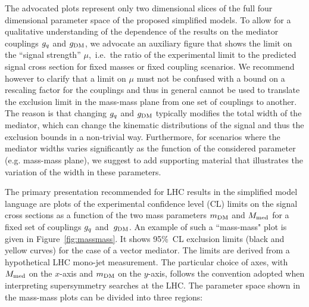 The advocated plots represent only two dimensional slices of the full four dimensional parameter space of the proposed simplified models. To allow for a qualitative understanding of the dependence of the results on the mediator couplings $g_q$ and $g_{\rm{DM}}$,  we advocate an auxiliary figure that shows the limit on the ``signal strength'' $\mu$,~i.e.~the ratio of the experimental limit to the predicted signal cross section for fixed masses or fixed coupling scenarios.  We recommend however to clarify that a limit on $\mu$ must not be confused with a bound on a rescaling factor for the couplings and thus in general cannot be used to translate the exclusion limit in the mass-mass plane from one set of couplings to another. The reason is that changing $g_q$ and $g_{\rm{DM}}$ typically modifies the total width of the mediator, which can change the kinematic distributions of the signal and thus the exclusion bounds in a non-trivial way. 
Furthermore, for scenarios where the mediator widths varies significantly as the function of the considered parameter (e.g. mass-mass plane), we suggest to add supporting material that illustrates the variation of the width in these parameters. 


The primary presentation recommended for LHC results in the simplified model language are plots of the experimental confidence level (CL) limits on the signal cross sections as a function of the two mass parameters $m_{\rm{DM}}$ and $M_{\rm{med}}$  for a fixed set of couplings $g_q$ and~$g_{\rm{DM}}$. An example of such a ``mass-mass" plot is given in Figure~\ref{fig:massmass}. It shows 95\%~CL exclusion limits (black and yellow curves) for the case of a vector mediator. The limits are derived from a hypothetical LHC mono-jet measurement. The particular choice of axes, with
 $M_{\rm{med}}$ on the $x$-axis and $m_{\rm{DM}}$ on the  $y$-axis, follows the convention adopted when interpreting supersymmetry 
 searches at the LHC. The parameter space shown in the mass-mass plots can be divided into three regions: 

